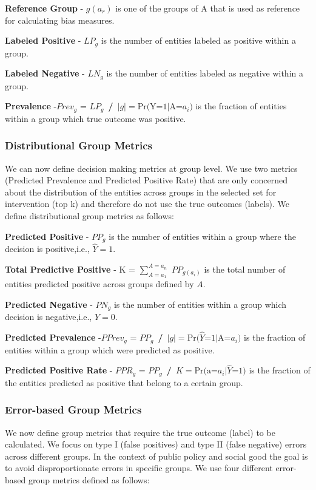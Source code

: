 \textbf{Reference Group} - $g(a_r)$ is one of the groups of A that is used as reference for calculating bias measures.

\textbf{Labeled Positive} - $LP_g$ is the number of entities labeled as positive within a group.                       

\textbf{Labeled Negative} - $LN_g$ is the number of entities labeled as negative within a group.                       

\textbf{Prevalence} -$Prev_g$ = $LP_g$\ \textbf{/}\ $|g| = \text{Pr(Y=1|A=}a_i)$ is the fraction of entities within a group which true outcome was positive.    \\

\subsubsection{Distributional Group Metrics}
We can now define decision making metrics at group level. We use two metrics (Predicted Prevalence and Predicted Positive Rate) that are only concerned about the distribution of the entities across groups in the selected set for intervention (top k) and therefore do not use the true outcomes (labels). We define distributional group metrics as follows: 

\textbf{Predicted Positive}      - $PP_g$ is the number of entities within a group where the decision is positive,i.e.,  $\widehat{Y}=1$. 

\textbf{Total Predictive Positive} - K = $\sum_{A=a_1}^{A=a_n}$ $PP_{g(a_i)}$ is the total number of entities predicted positive across groups defined by $A$.                                

\textbf{Predicted Negative}      - $PN_g$ is the number of entities within a group which decision is negative,i.e.,  $\widehat{Y}=0$.   

\textbf{Predicted Prevalence}    -$PPrev_g$ = $PP_g$\ \textbf{/}\ $|g| = \text{Pr(}\widehat{Y}\text{=1|A=}a_i)$ is the fraction of entities within a group which were predicted as positive.                              \

\textbf{Predicted Positive Rate} - $PPR_g$ = $PP_g$\ \textbf{/}\ $K = \text{Pr(a=}a_i|\widehat{Y}\text{=1)} $ is the fraction of the entities predicted as positive that belong to a certain group.    \\


\subsubsection{Error-based Group Metrics}
We now define group metrics that require the true outcome (label) to be calculated. We focus on type I (false positives) and type II (false negative) errors across different groups. In the context of public policy and social good the goal is to avoid disproportionate errors in specific groups. We use four different error-based group metrics defined as follows:

